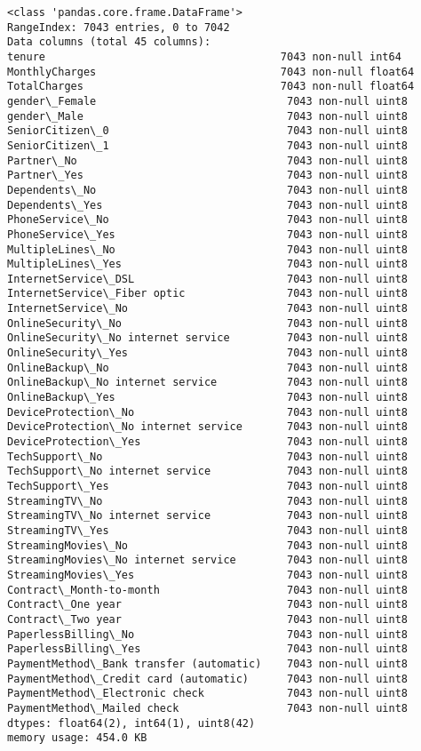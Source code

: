 \documentclass[11pt]{article}
\begin{document}
    \begin{Verbatim}[commandchars=\\\{\}]
<class 'pandas.core.frame.DataFrame'>
RangeIndex: 7043 entries, 0 to 7042
Data columns (total 45 columns):
tenure                                     7043 non-null int64
MonthlyCharges                             7043 non-null float64
TotalCharges                               7043 non-null float64
gender\_Female                              7043 non-null uint8
gender\_Male                                7043 non-null uint8
SeniorCitizen\_0                            7043 non-null uint8
SeniorCitizen\_1                            7043 non-null uint8
Partner\_No                                 7043 non-null uint8
Partner\_Yes                                7043 non-null uint8
Dependents\_No                              7043 non-null uint8
Dependents\_Yes                             7043 non-null uint8
PhoneService\_No                            7043 non-null uint8
PhoneService\_Yes                           7043 non-null uint8
MultipleLines\_No                           7043 non-null uint8
MultipleLines\_Yes                          7043 non-null uint8
InternetService\_DSL                        7043 non-null uint8
InternetService\_Fiber optic                7043 non-null uint8
InternetService\_No                         7043 non-null uint8
OnlineSecurity\_No                          7043 non-null uint8
OnlineSecurity\_No internet service         7043 non-null uint8
OnlineSecurity\_Yes                         7043 non-null uint8
OnlineBackup\_No                            7043 non-null uint8
OnlineBackup\_No internet service           7043 non-null uint8
OnlineBackup\_Yes                           7043 non-null uint8
DeviceProtection\_No                        7043 non-null uint8
DeviceProtection\_No internet service       7043 non-null uint8
DeviceProtection\_Yes                       7043 non-null uint8
TechSupport\_No                             7043 non-null uint8
TechSupport\_No internet service            7043 non-null uint8
TechSupport\_Yes                            7043 non-null uint8
StreamingTV\_No                             7043 non-null uint8
StreamingTV\_No internet service            7043 non-null uint8
StreamingTV\_Yes                            7043 non-null uint8
StreamingMovies\_No                         7043 non-null uint8
StreamingMovies\_No internet service        7043 non-null uint8
StreamingMovies\_Yes                        7043 non-null uint8
Contract\_Month-to-month                    7043 non-null uint8
Contract\_One year                          7043 non-null uint8
Contract\_Two year                          7043 non-null uint8
PaperlessBilling\_No                        7043 non-null uint8
PaperlessBilling\_Yes                       7043 non-null uint8
PaymentMethod\_Bank transfer (automatic)    7043 non-null uint8
PaymentMethod\_Credit card (automatic)      7043 non-null uint8
PaymentMethod\_Electronic check             7043 non-null uint8
PaymentMethod\_Mailed check                 7043 non-null uint8
dtypes: float64(2), int64(1), uint8(42)
memory usage: 454.0 KB

    \end{Verbatim}
\end{document}
